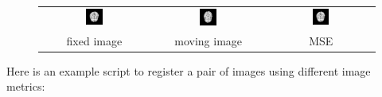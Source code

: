 \begin{figure}
    \label{fig:metric_example}
    \centering
    \begin{tabular}[h]{c|c|c}
        \includegraphics[width=0.16\textwidth]{Figures/r16slice.jpg} &
        \includegraphics[width=0.16\textwidth]{Figures/r64slice.jpg} &
        \includegraphics[width=0.16\textwidth]{Figures/resMSQ.jpg} \\
        fixed image &
        moving image & 
        MSE  \\
    \end{tabular} 
\end{figure}
Here is an example script to register a pair of images using different image metrics:
